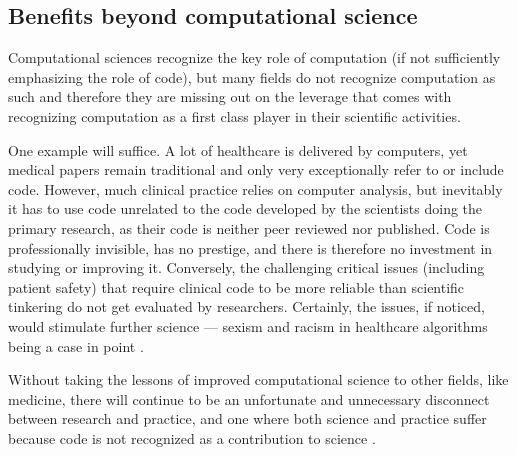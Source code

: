 \documentclass{comjnl}
\begin{document}
\begin{change}
\subsection{Benefits beyond computational science}
Computational sciences recognize the key role of computation (if not sufficiently emphasizing the role of code), but many fields do not recognize computation as such and therefore they are missing out on the leverage that comes with recognizing computation as a first class player in their scientific activities. 

One example will suffice. A lot of healthcare is delivered by computers, yet medical papers remain traditional and only very exceptionally refer to or include code. However, much clinical practice relies on computer analysis, but inevitably it has to use code unrelated to the code developed by the scientists doing the primary research, as their code is neither peer reviewed nor published. Code is professionally invisible, has no prestige, and there is therefore no investment in studying or improving it. Conversely, the challenging critical issues (including patient safety) that require clinical code to be more reliable than scientific tinkering do not get evaluated by researchers. Certainly, the issues, if noticed,  would stimulate further science --- sexism and racism in healthcare algorithms being a case in point \cite{fixit}. 

Without taking the lessons of improved computational science to other fields, like medicine, there will continue to be an unfortunate and unnecessary disconnect between research and practice, and one where both science and practice suffer because code is not recognized as a contribution to science \cite{fixit}. 

\end{change}

\end{document}
